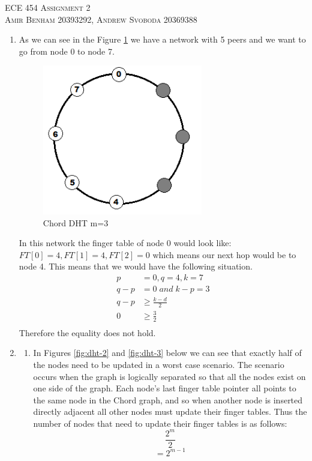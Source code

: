 \documentclass{article}
\begin{document}
\begin{center}
\textsc{\Large ECE 454 Assignment 2}\\[0.5cm]
\textsc{Amir Benham 20393292, Andrew Svoboda 20369388}\\[0.5cm]
\end{center}

\begin{enumerate}

	\item As we can see in the Figure \ref{fig:q1} we have a network with 5 peers and we want to go from node 0 to node 7.
		
\begin{figure}[ht!]
\centering
\includegraphics[width=70mm]{q1.png}
\caption{Chord DHT m=3}
\label{fig:q1}
\end{figure}
	
	In this network the finger table of node 0 would look like: \(FT[0]=4, FT[1]=4, FT[2]=0\) which means our next hop would be to node 4. This means that we would have the following situation.
\[
\begin{split}
p & =0, q=4, k=7 \\
q-p&=0 \; and\;  k-p=3 \\
q-p & \ge \frac{k-d}{2} \\
0 & \ge \frac{3}{2} \\
\end{split}
\]
Therefore the equality does not hold.

\item
 \begin{enumerate}
	\item In Figures \ref{fig:dht-2} and \ref{fig:dht-3} below we can see that exactly half of the nodes need to be updated in a worst case scenario. The scenario occurs when the graph is logically separated so that all the nodes exist on one side of the graph. Each node's last finger table pointer all points to the same node in the Chord graph, and so when another node is inserted directly adjacent all other nodes must update their finger tables. Thus the number of nodes that need to update their finger tables is as follows:
\[
\frac{2^m} {2}
\]
\[
=2^{m-1}
\]


\end{enumerate}
\end{enumerate}
\end{document}
